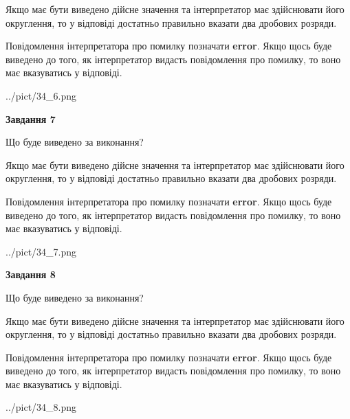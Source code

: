 \documentclass[12pt, ukrainian]{article}
\begin{document}
{\begin {Large}
Якщо має бути виведено дійсне значення та інтерпретатор має здійснювати його округлення, 
то у відповіді достатньо правильно вказати два дробових розряди.

Повідомлення інтерпретатора про помилку позначати \textbf{error}.
Якщо щось буде виведено до того, як інтерпретатор видасть повідомлення про помилку, 
то воно має вказуватись у відповіді. \par

\begin{center}
	{../pict/34_6.png}
\end{center}
\newpage

{\begin {center}\textbf{Завдання 7}\end {center}}\par
Що буде виведено за виконання? \par

Якщо має бути виведено дійсне значення та інтерпретатор має здійснювати його округлення, 
то у відповіді достатньо правильно вказати два дробових розряди.

Повідомлення інтерпретатора про помилку позначати \textbf{error}.
Якщо щось буде виведено до того, як інтерпретатор видасть повідомлення про помилку, 
то воно має вказуватись у відповіді. \par

\begin{center}
	{../pict/34_7.png}
\end{center}
\newpage

{\begin {center}\textbf{Завдання 8}\end {center}}\par
Що буде виведено за виконання? \par

Якщо має бути виведено дійсне значення та інтерпретатор має здійснювати його округлення, 
то у відповіді достатньо правильно вказати два дробових розряди.

Повідомлення інтерпретатора про помилку позначати \textbf{error}.
Якщо щось буде виведено до того, як інтерпретатор видасть повідомлення про помилку, 
то воно має вказуватись у відповіді. \par

\begin{center}
	{../pict/34_8.png}
\end{center}
\newpage


\end{Large}}
\end{document}
